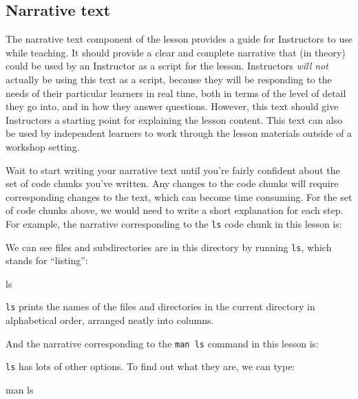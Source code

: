\documentclass[]{book}
\newenvironment{Shaded}{\begin{snugshade}}{\end{snugshade}}
\newcommand{\FunctionTok}[1]{\textcolor[rgb]{0.00,0.00,0.00}{#1}}
\newcommand{\NormalTok}[1]{#1}
\begin{document}
\hypertarget{narrative-text}{%
\subsection{Narrative text}\label{narrative-text}}

The narrative text component of the lesson provides a guide for Instructors to use while teaching. It should
provide a clear and complete narrative that (in theory) could be used by an Instructor as a script for
the lesson. Instructors \emph{will not} actually be using this text as a script, because they will be responding to
the needs of their particular learners in real time, both in terms of the level of detail they go into, and
in how they answer questions. However, this text should give Instructors a starting point for explaining the
lesson content. This text can also be used by independent learners to work through the lesson materials outside
of a workshop setting.

Wait to start writing your narrative text until you're fairly confident about the set of code chunks
you've written. Any changes to the code chunks will require corresponding changes to the text, which
can become time consuming. For the set of code chunks above, we would need to write a short explanation for
each step. For example, the narrative corresponding to the \texttt{ls} code chunk in this lesson is:

We can see files and subdirectories are in this directory by running \texttt{ls},
which stands for ``listing'':

\begin{Shaded}
\begin{Highlighting}[]
\FunctionTok{ls}
\end{Highlighting}
\end{Shaded}

\texttt{ls} prints the names of the files and directories in the current directory in
alphabetical order,
arranged neatly into columns.

And the narrative corresponding to the \texttt{man\ ls} command in this lesson is:

\texttt{ls} has lots of other options. To find out what they are, we can type:

\begin{Shaded}
\begin{Highlighting}[]
\FunctionTok{man}\NormalTok{ ls}
\end{Highlighting}
\end{Shaded}
\end{document}
